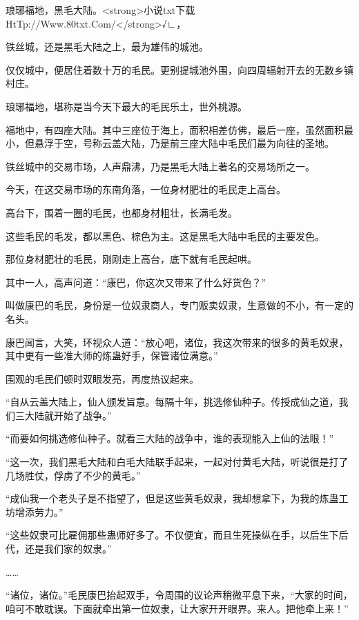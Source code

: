 
\begin{this_body}

琅琊福地，黑毛大陆。<strong>小说txt下载HtTp://Www.80txt.Com/</strong>√∟，

铁丝城，还是黑毛大陆之上，最为雄伟的城池。

仅仅城中，便居住着数十万的毛民。更别提城池外围，向四周辐射开去的无数乡镇村庄。

琅琊福地，堪称是当今天下最大的毛民乐土，世外桃源。

福地中，有四座大陆。其中三座位于海上，面积相差仿佛，最后一座，虽然面积最小，但悬浮于空，号称云盖大陆，乃是前三座大陆中毛民们最为向往的圣地。

铁丝城中的交易市场，人声鼎沸，乃是黑毛大陆上著名的交易场所之一。

今天，在这交易市场的东南角落，一位身材肥壮的毛民走上高台。

高台下，围着一圈的毛民，也都身材粗壮，长满毛发。

这些毛民的毛发，都以黑色、棕色为主。这是黑毛大陆中毛民的主要发色。

那位身材肥壮的毛民，刚刚走上高台，底下就有毛民起哄。

其中一人，高声问道：“康巴，你这次又带来了什么好货色？”

叫做康巴的毛民，身份是一位奴隶商人，专门贩卖奴隶，生意做的不小，有一定的名头。

康巴闻言，大笑，环视众人道：“放心吧，诸位，我这次带来的很多的黄毛奴隶，其中更有一些准大师的炼蛊好手，保管诸位满意。”

围观的毛民们顿时双眼发亮，再度热议起来。

“自从云盖大陆上，仙人颁发旨意。每隔十年，挑选修仙种子。传授成仙之道，我们三大陆就开始了战争。”

“而要如何挑选修仙种子。就看三大陆的战争中，谁的表现能入上仙的法眼！”

“这一次，我们黑毛大陆和白毛大陆联手起来，一起对付黄毛大陆，听说很是打了几场胜仗，俘虏了不少的黄毛。”

“成仙我一个老头子是不指望了，但是这些黄毛奴隶，我却想拿下，为我的炼蛊工坊增添劳力。”

“这些奴隶可比雇佣那些蛊师好多了。不仅便宜，而且生死操纵在手，以后生下后代，还是我们家的奴隶。”

……

“诸位，诸位。”毛民康巴抬起双手，令周围的议论声稍微平息下来，“大家的时间，咱可不敢耽误。下面就牵出第一位奴隶，让大家开开眼界。来人。把他牵上来！”


\end{this_body}
